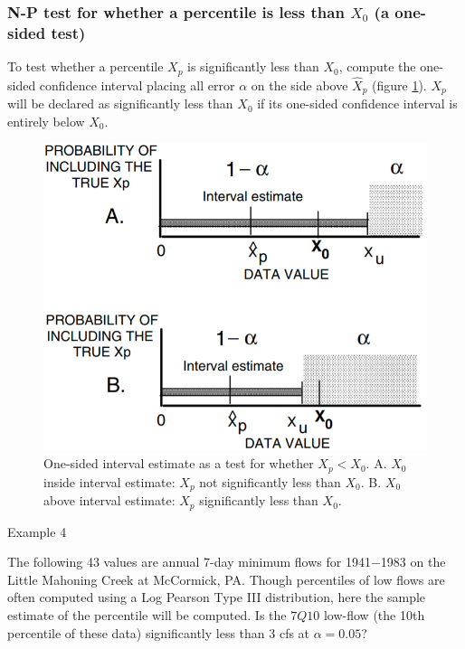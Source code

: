 \documentclass[]{book}
\begin{document}
\hypertarget{n-p-test-for-whether-a-percentile-is-less-than-x_0-a-one-sided-test}{%
\subsubsection{\texorpdfstring{N-P test for whether a percentile is less than \(X_{0}\) (a one-sided test)}{N-P test for whether a percentile is less than X\_\{0\} (a one-sided test)}}\label{n-p-test-for-whether-a-percentile-is-less-than-x_0-a-one-sided-test}}

To test whether a percentile \(X_{p}\) is significantly less than \(X_{0}\), compute the one-sided confidence interval placing all error \(\alpha\) on the side above \(\hat{X}_{p}\) (figure \ref{fig:fig-3-11}). \(X_{p}\) will be declared as significantly less than \(X_{0}\) if its one-sided confidence interval is entirely below \(X_{0}\).

\begin{figure}

{\centering \includegraphics[width=9.92in]{figures/3_11} 

}

\caption{One-sided interval estimate as a test for whether $X_{p} < X_{0}$.
A. $X_{0}$ inside interval estimate: $X_{p}$ not significantly less than $X_{0}$.
B. $X_{0}$ above interval estimate: $X_{p}$ significantly less than $X_{0}$.}\label{fig:fig-3-11}
\end{figure}

Example 4

The following 43 values are annual 7-day minimum flows for 1941−1983 on the Little Mahoning Creek at McCormick, PA. Though percentiles of low flows are often computed using a Log Pearson Type III distribution, here the sample estimate of the percentile will be computed. Is the \(7Q10\) low-flow (the 10th percentile of these data) significantly less than 3 cfs at \(\alpha = 0.05\)?
\end{document}
